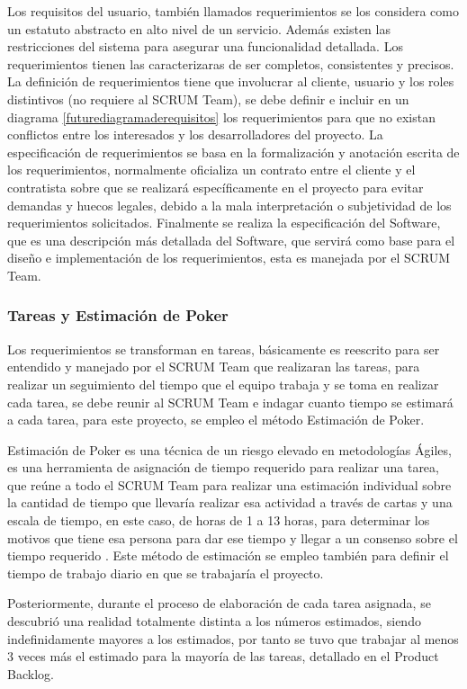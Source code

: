 Los requisitos del usuario, también llamados requerimientos se los considera como un estatuto abstracto en alto nivel de un servicio. Además existen las restricciones del sistema para asegurar una funcionalidad detallada. Los requerimientos tienen las caracterizaras de ser completos, consistentes y precisos. 
La definición de requerimientos tiene que involucrar al cliente, usuario y los roles distintivos (no requiere al SCRUM Team), se debe definir e incluir en un diagrama \ref{futurediagramaderequisitos} los requerimientos para que no existan conflictos entre los interesados y los desarrolladores del proyecto.
La especificación de requerimientos se basa en la formalización y anotación escrita de los requerimientos, normalmente oficializa un contrato entre el cliente y el contratista sobre que se realizará específicamente en el proyecto para evitar demandas y huecos legales, debido a la mala interpretación o subjetividad de los requerimientos solicitados.
Finalmente se realiza la especificación del Software, que es una descripción más detallada del Software, que servirá como base para el diseño e implementación de los requerimientos, esta es manejada por el SCRUM Team.

\subsubsection{Tareas y Estimación de Poker}

Los requerimientos se transforman en tareas, básicamente es reescrito para ser entendido y manejado por el SCRUM Team que realizaran las tareas, para realizar un seguimiento del tiempo que el equipo trabaja y se toma en realizar cada tarea, se debe reunir al SCRUM Team e indagar cuanto tiempo se estimará a cada tarea, para este proyecto, se empleo el método Estimación de Poker.

Estimación de Poker es una técnica de un riesgo elevado en metodologías Ágiles, es una herramienta de asignación de tiempo requerido para realizar una tarea, que reúne a todo el SCRUM Team para realizar una estimación individual sobre la cantidad de tiempo que llevaría realizar esa actividad a través de cartas y una escala de tiempo, en este caso, de horas de 1 a 13 horas, para determinar los motivos que tiene esa persona para dar ese tiempo y llegar a un consenso sobre el tiempo requerido \cite{scrumdiapo}. Este método de estimación se empleo también para definir el tiempo de trabajo diario en que se trabajaría el proyecto.

Posteriormente, durante el proceso de elaboración de cada tarea asignada, se descubrió una realidad totalmente distinta a los números estimados, siendo indefinidamente mayores a los estimados, por tanto se tuvo que trabajar al menos 3 veces más el estimado para la mayoría de las tareas, detallado en el Product Backlog.

